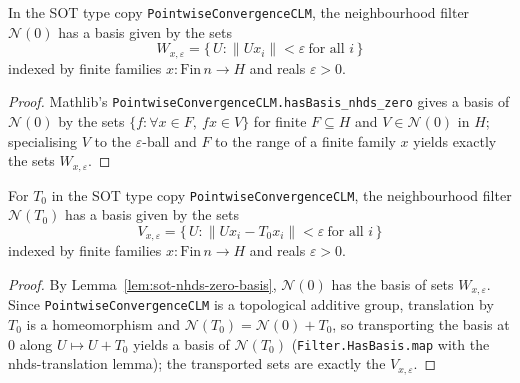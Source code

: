 \begin{lemma}
    \label{lem:sot-nhds-zero-basis}
    \leanok
    In the SOT type copy \texttt{PointwiseConvergenceCLM}, the neighbourhood
    filter $\mathcal N(0)$ has a basis given by the sets
    \[
        W_{x, \varepsilon}
        = \{\, U : \|U x_i\| < \varepsilon \ \text{for all } i \,\}
    \]
    indexed by finite families $x : \mathrm{Fin}\, n \to H$ and reals
    $\varepsilon > 0$.
\end{lemma}
\begin{proof}
    Mathlib's \texttt{PointwiseConvergenceCLM.hasBasis\_nhds\_zero} gives a basis
    of $\mathcal N(0)$ by the sets $\{f : \forall x \in F,\ f x \in V\}$ for finite
    $F \subseteq H$ and $V \in \mathcal N(0)$ in $H$; specialising $V$ to the
    $\varepsilon$-ball and $F$ to the range of a finite family $x$ yields exactly
    the sets $W_{x, \varepsilon}$.
\end{proof}

\begin{lemma}
    \label{lem:sot-nhds-basis}
    \leanok
    For $T_0$ in the SOT type copy \texttt{PointwiseConvergenceCLM}, the
    neighbourhood filter $\mathcal N(T_0)$ has a basis given by the sets
    \[
        V_{x, \varepsilon}
        = \{\, U : \|U x_i - T_0 x_i\| < \varepsilon \ \text{for all } i \,\}
    \]
    indexed by finite families $x : \mathrm{Fin}\, n \to H$ and reals
    $\varepsilon > 0$.
\end{lemma}
\begin{proof}
    By Lemma~\ref{lem:sot-nhds-zero-basis}, $\mathcal N(0)$ has the basis of sets
    $W_{x, \varepsilon}$. Since \texttt{PointwiseConvergenceCLM} is a topological
    additive group, translation by $T_0$ is a homeomorphism and
    $\mathcal N(T_0) = \mathcal N(0) + T_0$, so transporting the basis at $0$ along
    $U \mapsto U + T_0$ yields a basis of $\mathcal N(T_0)$
    (\texttt{Filter.HasBasis.map} with the nhds-translation lemma); the
    transported sets are exactly the $V_{x, \varepsilon}$.
\end{proof}

